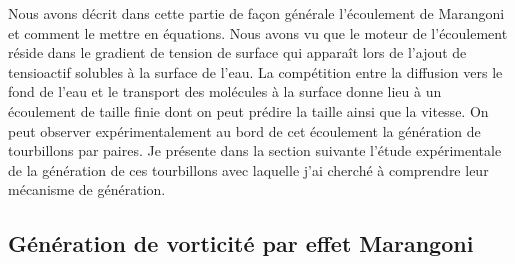 \documentclass[french, 10pt]{article}
\begin{document}
Nous avons décrit dans cette partie de façon générale l'écoulement de Marangoni et comment le mettre en équations. Nous avons vu que le moteur de l'écoulement réside dans le gradient de tension de surface qui apparaît lors de l'ajout de tensioactif solubles à la surface de l'eau. La compétition entre la diffusion vers le fond de l'eau et le transport des molécules à la surface donne lieu  à un écoulement de taille finie dont on peut prédire la taille ainsi que la vitesse. On peut observer expérimentalement au bord de cet écoulement la génération de tourbillons par paires. Je présente dans la section suivante l'étude expérimentale de la génération de ces tourbillons avec laquelle j'ai cherché à comprendre leur mécanisme de génération.

\subsection{Génération de vorticité par effet Marangoni}

\end{document}
